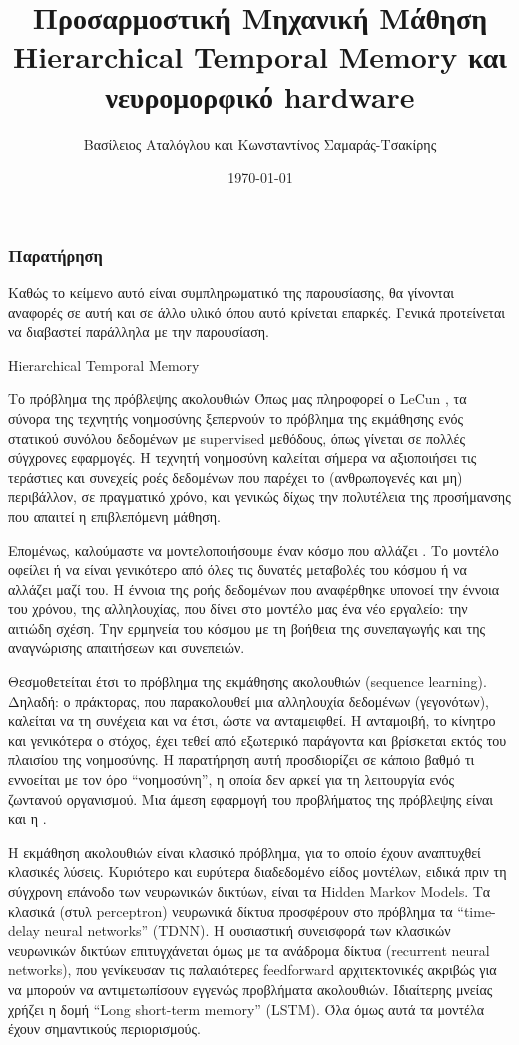 \documentclass[a4paper,11pt]{article}
\title{Προσαρμοστική Μηχανική Μάθηση \linebreak Hierarchical Temporal Memory και νευρομορφικό hardware}
\author{Βασίλειος Αταλόγλου και Κωνσταντίνος Σαμαράς-Τσακίρης}
\date{\today}
\renewcommand{\emph}[1]{\textcolor{blue}{\oldemph{#1}}}
\begin{document}
\maketitle

\subsubsection*{Παρατήρηση}
Καθώς το κείμενο αυτό είναι συμπληρωματικό της παρουσίασης, θα γίνονται αναφορές σε αυτή και σε άλλο υλικό όπου αυτό κρίνεται επαρκές. Γενικά προτείνεται να διαβαστεί παράλληλα με την παρουσίαση.

\begin{section}{Hierarchical Temporal Memory}
  \begin{subsection}{Το πρόβλημα της πρόβλεψης ακολουθιών}
	Όπως μας πληροφορεί ο LeCun \cite{lecun}, τα σύνορα της τεχνητής νοημοσύνης ξεπερνούν το πρόβλημα της εκμάθησης ενός στατικού συνόλου δεδομένων με supervised μεθόδους, όπως γίνεται σε πολλές σύγχρονες εφαρμογές. Η τεχνητή νοημοσύνη καλείται σήμερα να αξιοποιήσει τις τεράστιες και συνεχείς ροές δεδομένων που παρέχει το (ανθρωπογενές και μη) περιβάλλον, σε πραγματικό χρόνο, και γενικώς δίχως την πολυτέλεια της προσήμανσης που απαιτεί η επιβλεπόμενη μάθηση.

	Επομένως, καλούμαστε να μοντελοποιήσουμε έναν κόσμο που αλλάζει \cite{staticbottleneck}. Το μοντέλο οφείλει ή να είναι γενικότερο από όλες τις δυνατές μεταβολές του κόσμου ή να αλλάζει μαζί του. Η έννοια της ροής δεδομένων που αναφέρθηκε υπονοεί την έννοια του χρόνου, της αλληλουχίας, που δίνει στο μοντέλο μας ένα νέο εργαλείο: την αιτιώδη σχέση. Την ερμηνεία του κόσμου με τη βοήθεια της συνεπαγωγής και της αναγνώρισης απαιτήσεων και συνεπειών.

	Θεσμοθετείται έτσι το πρόβλημα της εκμάθησης ακολουθιών (sequence learning). Δηλαδή: ο πράκτορας, που παρακολουθεί μια αλληλουχία δεδομένων (γεγονότων), καλείται να \emph{προβλέψει} τη συνέχεια και να \emph{δράσει} έτσι, ώστε να ανταμειφθεί. Η ανταμοιβή, το κίνητρο και γενικότερα ο στόχος, έχει τεθεί από εξωτερικό παράγοντα και βρίσκεται εκτός του πλαισίου της νοημοσύνης. Η παρατήρηση αυτή προσδιορίζει σε κάποιο βαθμό τι εννοείται με τον όρο ``νοημοσύνη'', η οποία δεν αρκεί για τη λειτουργία ενός ζωντανού οργανισμού. Μια άμεση εφαρμογή του προβλήματος της πρόβλεψης είναι και η \emph{αναγνώριση ανωμαλιών}.

	Η εκμάθηση ακολουθιών είναι κλασικό πρόβλημα, για το οποίο έχουν αναπτυχθεί κλασικές λύσεις. Κυριότερο και ευρύτερα διαδεδομένο είδος μοντέλων, ειδικά πριν τη σύγχρονη επάνοδο των νευρωνικών δικτύων, είναι τα Hidden Markov Models. Τα κλασικά (στυλ perceptron) νευρωνικά δίκτυα προσφέρουν στο πρόβλημα τα ``time-delay neural networks'' (TDNN). Η ουσιαστική συνεισφορά των κλασικών νευρωνικών δικτύων επιτυγχάνεται όμως με τα ανάδρομα δίκτυα (recurrent neural networks), που γενίκευσαν τις παλαιότερες feedforward αρχιτεκτονικές ακριβώς για να μπορούν να αντιμετωπίσουν εγγενώς προβλήματα ακολουθιών. Ιδιαίτερης μνείας χρήζει η δομή ``Long short-term memory'' (LSTM). Όλα όμως αυτά τα μοντέλα έχουν σημαντικούς περιορισμούς.


\end{subsection}
\end{section}
\end{document}
